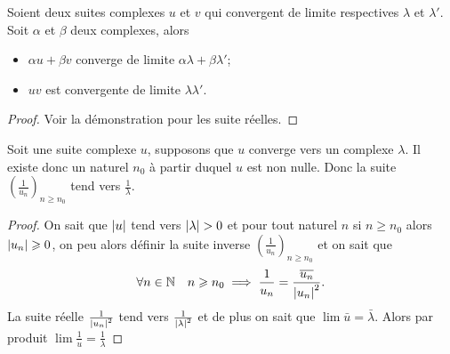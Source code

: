 \begin{prop}
  Soient deux suites complexes \(u\) et \(v\) qui convergent de limite respectives \(\lambda\) et \(\lambda'\). Soit \(\alpha\) et \(\beta\) deux complexes, alors
  \begin{itemize}
  \item \(\alpha u + \beta v\) converge de limite \(\alpha \lambda + \beta \lambda'\);
  \item \(uv\) est convergente de limite \(\lambda \lambda'\).
  \end{itemize}
\end{prop}
\begin{proof} Voir la démonstration pour les suite réelles.
\end{proof}
\begin{prop}
  Soit une suite complexe \(u\), supposons que \(u\) converge vers un complexe \(\lambda\). Il existe donc un naturel \(n_0\) à partir duquel \(u\) est non nulle. Donc la suite \(\left(\frac{1}{u_n}\right)_{n \geqslant n_0}\) tend vers \(\frac{1}{\lambda}\).
\end{prop}
\begin{proof}
  On sait que \(\left\lvert u\right\rvert\) tend vers \(\left\lvert\lambda\right\rvert>0\) et pour tout naturel \(n\) si \(n \geqslant n_0\) alors \(\left\lvert u_n\right\rvert \geqslant 0\), on peu alors définir la suite inverse \(\left(\frac{1}{u_n}\right)_{n \geqslant n_0}\) et on sait que
  \begin{equation}
    \forall n \in \mathbb{N} \quad n \geqslant n_0 \implies \frac{1}{u_n}=\frac{\overline{u_n}}{\left\lvert u_n\right\rvert^2}.
  \end{equation}
La suite réelle \(\frac{1}{\left\lvert u_n\right\rvert^2}\) tend vers \(\frac{1}{\left\lvert\lambda\right\rvert^2}\) et de plus on sait que \(\lim \bar{u}=\bar{\lambda}\). Alors par produit \(\lim \frac{1}{u}=\frac{1}{\lambda}\)
\end{proof}

